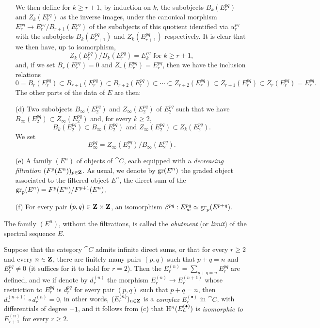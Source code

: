 \begin{env}[11.1.1]
\begin{enumerate}
  We then define for $k\geq r+1$, by induction on $k$, the subobjects $B_k(E_r^{pq})$ and $Z_k(E_r^{pq})$ as the inverse images, under the canonical morphism $E_r^{pq}\to E_r^{pq}/B_{r+1}(E_r^{pq})$ of the subobjects of this quotient identified via $\alpha_r^{pq}$ with the subobjects $B_k(E_{r+1}^{pq})$ and $Z_k(E_{r+1}^{pq})$ respectively.
It is clear that we then have, up to isomorphism,
  \[
  \label{0.11.1.1.1}
    Z_k(E_r^{pq})/B_k(E_r^{pq})=E_k^{pq}\text{ for }k\geq r+1,
    \tag{11.1.1.1}
  \]
  and, if we set $B_r(E_r^{pq})=0$ and $Z_r(E_r^{pq})=E_r^{pq}$, then we have the inclusion relations
  \[
  \label{0.11.1.1.2}
    0=B_r(E_r^{pq})\subset B_{r+1}(E_r^{pq})\subset B_{r+2}(E_r^{pq})\subset\cdots\subset Z_{r+2}(E_r^{pq})\subset Z_{r+1}(E_r^{pq})\subset Z_r(E_r^{pq})=E_r^{pq}.
    \tag{11.1.1.1.2}
  \]
  The other parts of the data of $E$ are then:
  \item[(d)] Two subobjects $B_\infty(E_2^{pq})$ and $Z_\infty(E_2^{pq})$ of $E_2^{pq}$ such that we have $B_\infty(E_2^{pq})\subset Z_\infty(E_2^{pq})$ and, for every $k\geq 2$,
    \[
      B_k(E_2^{pq})\subset B_\infty(E_2^{pq})\text{ and }Z_\infty(E_2^{pq})\subset Z_k(E_2^{pq}).
    \]
    We set
    \[
    \label{0.11.1.1.3}
      E_\infty^{pq}=Z_\infty(E_2^{pq})/B_\infty(E_2^{pq}).
      \tag{11.1.1.1.3}
    \]
  \item[(e)]
    A family $(E^n)$ of objects of $\cat{C}$, each equipped with a \emph{decreasing filtration $(F^p(E^n))_{p\in\mathbf{Z}}$}.
    As usual, we denote by $\operatorname{gr}(E^n)$ the graded object associated to the filtered object $E^n$, the direct sum of the $\operatorname{gr}_p(E^n)=F^p(E^n)/F^{p+1}(E^n)$.
  \item[(f)] For every pair $(p,q)\in\mathbf{Z}\times\mathbf{Z}$, an isomorphism $\beta^{pq}:E_\infty^{pq}\simeq\operatorname{gr}_p(E^{p+q})$.
\end{enumerate}

The family $(E^n)$, without the filtrations, is called the \emph{abutment} (or \emph{limit}) of the spectral sequence $E$.

Suppose that the category $\cat{C}$ admits infinite direct sums, or that for every $r\geq 2$ and every $n\in\mathbf{Z}$, there are finitely many pairs $(p,q)$ such that $p+q=n$ and $E_r^{pq}\neq 0$ (it suffices for it to hold for $r=2$).
Then the $E_r^{(n)}=\sum_{p+q=n}E_r^{pq}$ are defined, and we if denote by $d_r^{(n)}$ the morphism $E_r^{(n)}\to E_r^{(n+1)}$ whose restriction to $E_r^{pq}$ is $d_r^{pq}$ for every pair $(p,q)$ such that $p+q=n$, then $d_r^{(n+1)}\circ d_r^{(n)}=0$, in other words, $(E_r^{(n)})_{n\in\mathbf{Z}}$ is a \emph{complex $E_r^{(\bullet)}$} in $\cat{C}$, with differentials of degree $+1$, and it follows from (c) that $\mathrm{H}^n(E_n^{(\bullet)})$ is \emph{isomorphic to $E_{r+1}^{(n)}$} for every $r\geq 2$.
\end{env}

